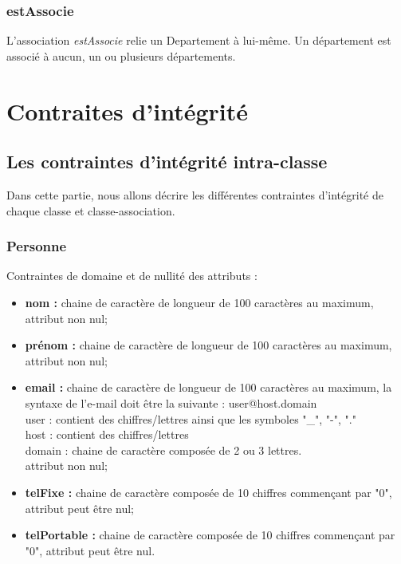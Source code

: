 \documentclass[asi, sansVersion]{picInsa}
\begin{document}
\subsection*{estAssocie}

L'association \textit{estAssocie} relie un Departement à lui-même. Un département est associé à aucun, un ou plusieurs départements.

\chapter{Contraites d'intégrité}

\section{Les contraintes d'intégrité intra-classe}
Dans cette partie, nous allons décrire les différentes contraintes d'intégrité de chaque classe et classe-association.
 
\subsection*{Personne}
Contraintes de domaine et de nullité des attributs :
\begin{itemize}
 	\item \textbf{nom :} chaine de caractère de longueur de 100 caractères au maximum, attribut non nul;
	\item \textbf{prénom :} chaine de caractère de longueur de 100 caractères au maximum, attribut non nul;
	\item \textbf{email :} chaine de caractère de longueur de 100 caractères au maximum, la syntaxe de l'e-mail doit être la suivante : user@host.domain\\
	user : contient des chiffres/lettres ainsi que les symboles "\_", "-", "." \\
	host : contient des chiffres/lettres \\
	domain : chaine de caractère composée de 2 ou 3 lettres. \\
	attribut non nul;  
	\item \textbf{telFixe :} chaine de caractère composée de 10 chiffres commençant par "0", attribut peut être nul;
	\item \textbf{telPortable :} chaine de caractère composée de 10 chiffres commençant par "0", attribut peut être nul.\\
\end{itemize}  
\end{document}
